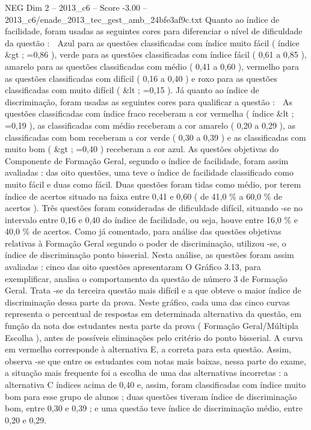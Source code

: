 \begin{textsample}{NEG Dim 2 – 2013\_c6 – Score -3.00 – 2013\_c6/enade\_2013\_tec\_gest\_amb\_24bfe3af9c.txt}
Quanto ao índice de facilidade, foram usadas as seguintes cores para diferenciar o nível de dificuldade da questão :  Azul para as questões classificadas com índice muito fácil ( índice \&gt ; =0,86 ), verde para as questões classificadas com índice fácil ( 0,61 a 0,85 ), amarelo para as questões classificadas com médio ( 0,41 a 0,60 ), vermelho para as questões classificadas com difícil ( 0,16 a 0,40 ) e roxo para as questões classificadas com muito difícil ( \&lt ; =0,15 ).
Já quanto ao índice de discriminação, foram usadas as seguintes cores para qualificar a questão :  As questões classificadas com índice fraco receberam a cor vermelha ( índice \&lt ; =0,19 ), as classificadas com médio receberam a cor amarelo ( 0,20 a 0,29 ), as classificadas com bom receberam a cor verde ( 0,30 a 0,39 ) e as classificadas com muito bom ( \&gt ; =0,40 ) receberam a cor azul.
As questões objetivas do Componente de Formação Geral, segundo o índice de facilidade, foram assim avaliadas : das oito questões, uma teve o índice de facilidade classificado como muito fácil e duas como fácil.
Duas questões foram tidas como médio, por terem índice de acertos situado na faixa entre 0,41 e 0,60 ( de 41,0 \% a 60,0 \% de acertos ).
Três questões foram consideradas de dificuldade difícil, situando -se no intervalo entre 0,16 e 0,40 do índice de facilidade, ou seja, houve entre 16,0 \% e 40,0 \% de acertos.
Como já comentado, para análise das questões objetivas relativas à Formação Geral segundo o poder de discriminação, utilizou -se, o índice de discriminação ponto bisserial.
Nesta análise, as questões foram assim avaliadas : cinco das oito questões apresentaram O Gráfico 3.13, para exemplificar, analisa o comportamento da questão de número 3 de Formação Geral.
Trata -se da terceira questão mais difícil e a que obteve o maior índice de discriminação dessa parte da prova.
Neste gráfico, cada uma das cinco curvas representa o percentual de respostas em determinada alternativa da questão, em função da nota dos estudantes nesta parte da prova ( Formação Geral/Múltipla Escolha ), antes de possíveis eliminações pelo critério do ponto bisserial.
A curva em vermelho corresponde à alternativa E, a correta para esta questão.
Assim, observa -se que entre os estudantes com notas mais baixas, nessa parte do exame, a situação mais frequente foi a escolha de uma das alternativas incorretas : a alternativa C índices acima de 0,40 e, assim, foram classificadas com índice muito bom para esse grupo de alunos ; duas questões tiveram índice de discriminação bom, entre 0,30 e 0,39 ; e uma questão teve índice de discriminação médio, entre 0,20 e 0,29.

\end{textsample}
